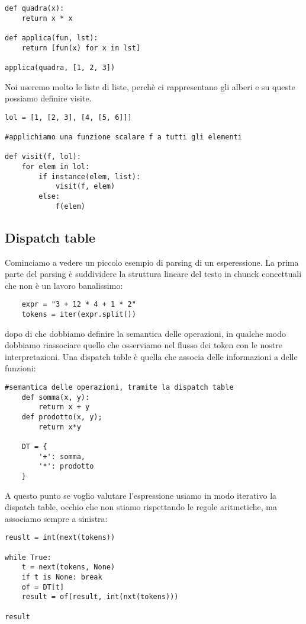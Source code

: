 \begin{lstlisting} 
def quadra(x):
    return x * x

def applica(fun, lst):
    return [fun(x) for x in lst]

applica(quadra, [1, 2, 3])
\end{lstlisting}

Noi useremo molto le liste di liste, perchè ci rappresentano gli alberi e su queste possiamo definire visite.

\begin{lstlisting} 
lol = [1, [2, 3], [4, [5, 6]]]

#applichiamo una funzione scalare f a tutti gli elementi

def visit(f, lol):
    for elem in lol:
        if instance(elem, list):
            visit(f, elem)
        else:
            f(elem)
\end{lstlisting}

\subsection{Dispatch table}
Cominciamo a vedere un piccolo esempio di parsing di un esperessione. La prima parte del parsing è suddividere la struttura lineare del testo in chunck concettuali che non è un lavoro banalissimo:

\begin{lstlisting}
    expr = "3 + 12 * 4 + 1 * 2"
    tokens = iter(expr.split())
\end{lstlisting}

dopo di che dobbiamo definire la semantica delle operazioni, in qualche modo dobbiamo riassociare quello che osserviamo nel flusso dei token con le nostre interpretazioni. Una dispatch table è quella che associa delle informazioni a delle funzioni:

\begin{lstlisting} 
#semantica delle operazioni, tramite la dispatch table
    def somma(x, y):
        return x + y
    def prodotto(x, y);
        return x*y
    
    DT = {
        '+': somma,
        '*': prodotto
    }
\end{lstlisting}

A questo punto se voglio valutare l'espressione usiamo in modo iterativo la dispatch table, occhio che non stiamo rispettando le regole aritmetiche, ma associamo sempre a sinistra:

\begin{lstlisting} 
reuslt = int(next(tokens))

while True:
    t = next(tokens, None)
    if t is None: break
    of = DT[t]
    result = of(result, int(nxt(tokens)))

result
\end{lstlisting}

